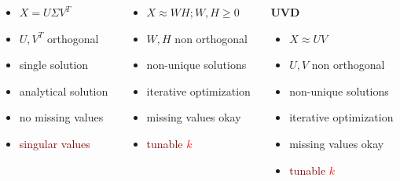 \documentclass[xcolor={dvipsnames}]{beamer}
\begin{document}
{\begin{columns}
\hspace*{1em}
\begin{column}{.5\textwidth}
\LARGE
{}
\normalsize 
\begin{itemize}
\item<3-> \textcolor{NavyBlue}{$X = U\Sigma V^T$}
\item<4-> $U, V^T$ orthogonal 
\item<5-> single solution
\item<6-> analytical solution
\item<7->  \textcolor{NavyBlue}{no missing values}
\item<8->  \textcolor{Maroon}{singular values}
\end{itemize}
\end{column}
\hspace*{-5em}
\begin{column}{.5\textwidth}
\LARGE
{}
\normalsize 
\begin{itemize}
\item<3-> \textcolor{NavyBlue}{$X \approx WH; W, H \geq 0$}
\item<4-> $W, H$ non orthogonal 
\item<5-> non-unique solutions
\item<6-> iterative optimization
\item<7->  \textcolor{NavyBlue}{missing values okay}
\item<8-> \textcolor{Maroon}{tunable \textcolor{red}{$k$}}
\end{itemize}
\end{column}
\hspace*{-3em}\begin{column}{.5\textwidth}
\LARGE
\textbf{UVD}
\normalsize 
\begin{itemize}
\item<3-> \textcolor{NavyBlue}{$X \approx UV$}
\item<4-> $U, V$ non orthogonal 
\item<5-> non-unique solutions
\item<6-> iterative optimization
\item<7->  \textcolor{NavyBlue}{missing values okay}
\item<8-> \textcolor{Maroon}{tunable \textcolor{red}{$k$}}
\end{itemize}
\end{column}
\end{columns}

}
\end{document}
